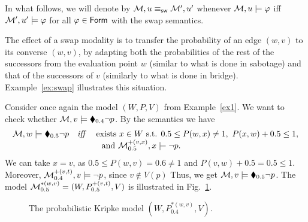 In what follows, we will denote  by $\mathcal{M} , u \equiv_{\mathsf{sw}} \mathcal{M}' , u'$ whenever $\mathcal{M} , u \models \varphi$ iff $\mathcal{M}' , u' \models \varphi$ for all $\varphi \in \mathsf{Form} $ with the swap semantics.

\medskip

The effect of a swap modality is to transfer the probability of an edge $(w,v)$ to its converse $(w,v)$, by adapting both the probabilities of the rest of the successors from the evaluation point $w$ (similar to what is done in sabotage) and that of the successors of $v$ (similarly to what is done in bridge). Example~\ref{ex:swap} illustrates this situation.

\begin{example}\label{ex:swap}
Consider once again the model $(W,P,V)$ from Example~\ref{ex1}. We want to check whether $\mathcal{M},v\models\blacklozenge_{0.4} \neg p$. By the semantics we have 
\[
\begin{array}{lcl}
\mathcal{M},w\models\blacklozenge_{0.5} \neg p  &  \text{\it iff} & \text{ exists } x\in W \text{ s.t. } 0.5 \leq P(w,x) \neq 1,\ P(x,w)+0.5 \leq 1,  \\ 
& & \ \ \text{ and } \mathcal{M}^{+(v,x)}_{0.5}, x \models \neg p.
\end{array}
\]
We can take $x=v$, as $0.5\leq P(w,v)=0.6 \neq 1$ and $P(v,w)+0.5= 0.5 \leq 1$. Moreover, $\mathcal{M}^{+(v,t)}_{0.4}, v\models \neg p$, since $v\notin V(p)$ Thus, we get $\mathcal{M},v\models\blacklozenge_{0.5} \neg p$.
The model $\mathcal{M}^{*(w,v)}_{0.5}=(W,P^{+(v,t)}_{0.5},V)$ is illustrated in Fig.~\ref{fig:swap}.

\begin{figure}[!ht]
    \centering
    \caption{The probabilistic Kripke model $(W,P^{*(w,v)}_{0.4},V)$.}
    \label{fig:swap}
\end{figure}
\end{example}


